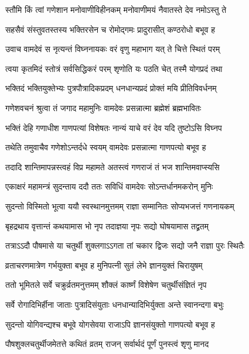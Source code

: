 \twolineshloka
{स्तौमि किं त्वां गणेशान मनोवाणीविहीनकम्}
{मनोवाणीमयं नैवातस्ते देव नमोऽस्तु ते} %

\twolineshloka
{सहसैवं संस्तुवतस्तस्य भक्तिरसेन च}
{रोमोद्गमः प्रादुरासीत् कण्ठरोधो बभूव ह} %

\twolineshloka
{उवाच वामदेवं स नृत्यन्तं विघ्ननायकः}
{वरं वृणु महाभाग यत् ते चित्ते स्थितं परम्} %

\twolineshloka
{त्वया कृतमिदं स्तोत्रं सर्वसिद्धिकरं परम्}
{श‍ृणोति यः पठति चेत् तस्मै योगप्रदं तथा} %

\twolineshloka
{भक्तिदं भक्तियुक्तेभ्यः पुत्रपौत्रादिकप्रदम्}
{धनधान्यप्रदं प्रोक्तं मयि प्रीतिविवर्धनम्} %

\twolineshloka
{गणेशवचनं श्रुत्वा तं जगाद महामुनिः}
{वामदेवः प्रसन्नात्मा ब्रह्मेशं ब्रह्मभावितः} %

\twolineshloka
{भक्तिं देहि गणाधीश गाणपत्यां विशेषतः}
{नान्यं याचे वरं देव यदि तुष्टोऽसि विघ्नप} %

\twolineshloka
{तथेति तमुवाचैव गणेशोऽन्तर्दधे स्वयम्}
{वामदेवः प्रसन्नात्मा गाणपत्यो बभूव ह} %

\twolineshloka
{तदादि शान्तिमापन्नस्त्वहं विप्र महामते}
{अतस्त्वं गणराजं तं भज शान्तिमवाप्स्यसि} %

\twolineshloka
{एकाक्षरं महामन्त्रं सुदन्ताय ददौ ततः}
{सविधिं वामदेवः सोऽन्तर्धानमकरोन् मुनिः} %

\twolineshloka
{सुदन्तो विस्मितो भूत्वा ययौ स्वस्थानमुत्तमम्}
{राज्ञा सम्मानितः सोप्यभजत्तं गणनायकम्} %

\twolineshloka
{बृहद्रथाय वृत्तान्तं कथयामास भो नृप}
{तदाज्ञया नृपः सद्यो घोषयामास तद्व्रतम्} %

\twolineshloka
{तत्राऽऽदौ पौषमासे या चतुर्थी शुक्लगाऽऽगता}
{तां चकार द्विजः सद्यो जनै राज्ञा पुरः स्थितैः} %

\twolineshloka
{व्रताचरणमात्रेण गर्भयुक्ता बभूव ह}
{मुनिपत्नी सुतं लेभे ज्ञानयुक्तं चिरायुषम्} %

\twolineshloka
{ततो भूमितले सर्वे चक्रुर्व्रतमनुत्तमम्}
{शौक्लं कार्ष्णं विशेषेण चतुर्थीसंज्ञितं नृप} %

\twolineshloka
{सर्वे रोगादिभिर्हीना जाताः पुत्रादिसंयुताः}
{धनधान्यादिभिर्युक्ता अन्ते स्वानन्दगा बभुः} %

\twolineshloka
{सुदन्तो योगिवन्द्यश्च बभूवे योगसेवया}
{राजाऽपि ज्ञानसंयुक्तो गाणपत्यो बभूव ह} %

\twolineshloka
{पौषशुक्लचतुर्थीजमेतत्ते कथितं व्रतम्}
{राजन् सर्वार्थदं पूर्णं पुनस्त्वं श‍ृणु मानद} %


